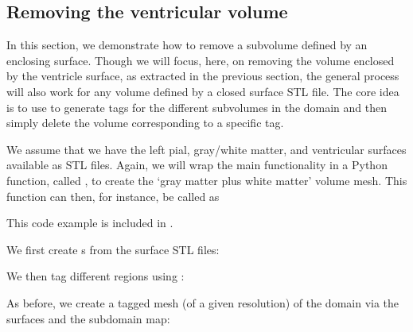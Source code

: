 \subsection{Removing the ventricular volume}
\label{sec:chp4:tools:remove-vent:removal}  
In this section, we demonstrate how to remove a subvolume defined by
an enclosing surface. Though we will focus, here, on removing the
volume enclosed by the ventricle surface, as extracted in the previous
section, the general process will also work for any volume defined by
a closed surface STL file. The core idea is to use \svmtk{} to
generate tags for the different subvolumes in the domain and then
simply delete the volume corresponding to a specific tag.  

We assume that we have the left pial, gray/white matter, and ventricular
surfaces available as STL files. Again, we will wrap the main
functionality in a Python function, called
, to create the `gray matter plus white matter' 
volume mesh. This 
function can then, for instance, be called as

\noindent This code example is included in
.

We first create s from the surface STL files:

\noindent We then tag different regions using : 

\noindent As before, we create a tagged mesh (of a given resolution)
of the domain via the surfaces and the subdomain map:

